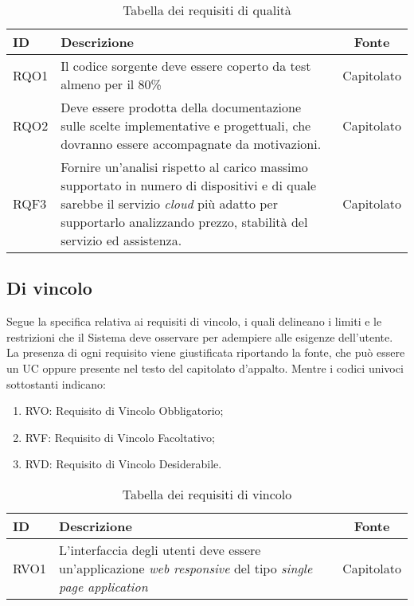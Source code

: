 \begin{table}[H]
	\renewcommand{\arraystretch}{1.5}
	\centering
	\begin{tabularx}{\textwidth}{l|X|c}
		\textbf{ID} & \textbf{Descrizione}                                                                                                                                                                                                 & \textbf{Fonte} \\
		\hline
		RQO1        & Il codice sorgente deve essere coperto da test almeno per il 80\%                                                                                                                                                    & Capitolato     \\
		\hline
		RQO2        & Deve essere prodotta della documentazione sulle scelte implementative e progettuali, che dovranno essere accompagnate da motivazioni.                                                                                & Capitolato     \\
		\hline
		RQF3        & Fornire un'analisi rispetto al carico massimo supportato in numero di dispositivi e di quale sarebbe il servizio \textit{cloud} più adatto per supportarlo analizzando prezzo, stabilità del servizio ed assistenza. & Capitolato     \\
		\hline
	\end{tabularx}
	\caption{Tabella dei requisiti di qualità}
\end{table}
\newpage
\subsection{Di vincolo}

Segue la specifica relativa ai requisiti di vincolo, i quali delineano i limiti e le restrizioni che il Sistema deve osservare per adempiere alle esigenze dell'utente.
La presenza di ogni requisito viene giustificata riportando la fonte, che può essere un UC oppure presente
nel testo del capitolato d'appalto. Mentre i codici univoci sottostanti indicano:
\begin{enumerate}
	\item RVO: Requisito di Vincolo Obbligatorio;
	\item RVF: Requisito di Vincolo Facoltativo;
	\item RVD: Requisito di Vincolo Desiderabile.
\end{enumerate}

\begin{table}[H]
	\renewcommand{\arraystretch}{1.5}
	\centering
	\begin{tabularx}{\textwidth}{l|X|c}
		\textbf{ID} & \textbf{Descrizione}                                                                                                     & \textbf{Fonte} \\
		\hline
		RVO1        & L'interfaccia degli utenti deve essere un'applicazione \textit{web responsive} del tipo \textit{single page application} & Capitolato     \\
		\hline
	\end{tabularx}
	\caption{Tabella dei requisiti di vincolo}
\end{table}
